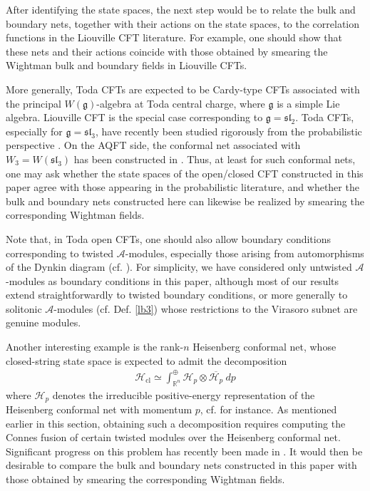 \documentclass[11pt,b5paper,notitlepage]{article}
\theoremstyle{definition}
\theoremstyle{plain}
\newcommand{\fk}{\mathfrak}
\newcommand{\ovl}{\overline}
\newcommand{\gk}{\mathfrak g}
\newcommand{\Rbb}{\mathbb R}
\newcommand{\MA}{\mathcal A}
\newcommand{\MH}{\mathcal H}
\newcommand{\Hcl}{\mathcal H_{\mathrm{cl}}}
\numberwithin{equation}{section}
\begin{document}
After identifying the state spaces, the next step would be to relate the bulk and boundary nets, together with their actions on the state spaces, to the correlation functions in the Liouville CFT literature. For example, one should show that these nets and their actions coincide with those obtained by smearing the Wightman bulk and boundary fields in Liouville CFTs.


More generally, Toda CFTs are expected to be Cardy-type CFTs associated with the principal $W(\gk)$-algebra at Toda central charge, where $\gk$ is a simple Lie algebra. Liouville CFT is the special case corresponding to $\gk=\fk{sl}_2$. Toda CFTs, especially for $\gk=\fk{sl}_3$, have recently been studied rigorously from the probabilistic perspective \cite{CRV23,CH22,Cer24,Cer25,CH24a,CH24b,CH25}. On the AQFT side, the conformal net associated with $W_3=W(\fk{sl}_3)$ has been constructed in \cite{CTW23,CTW22}. Thus, at least for such conformal nets, one may ask whether the state spaces of the open/closed CFT constructed in this paper agree with those appearing in the probabilistic literature, and whether the bulk and boundary nets constructed here can likewise be realized by smearing the corresponding Wightman fields.

Note that, in Toda open CFTs, one should also allow boundary conditions corresponding to twisted $\MA$-modules, especially those arising from automorphisms of the Dynkin diagram (cf. \cite{CH24a,CH24b,CH25}). For simplicity, we have considered only untwisted $\MA$-modules as boundary conditions in this paper, although most of our results extend straightforwardly to twisted boundary conditions, or more generally to solitonic $\MA$-modules (cf. Def. \ref{lb3}) whose restrictions to the Virasoro subnet are genuine modules.


Another interesting example is the rank-$n$ Heisenberg conformal net, whose closed-string state space is expected to admit the decomposition
\begin{align*}
\Hcl\simeq\int_{\Rbb^n}^\oplus\MH_p\otimes\ovl{\MH_p}~dp
\end{align*}
where $\MH_p$ denotes the irreducible positive-energy representation of the Heisenberg conformal net with momentum $p$, cf. \cite[Sec. B.1]{Luk07} for instance. As mentioned earlier in this section, obtaining such a decomposition requires computing the Connes fusion of certain twisted modules over the Heisenberg conformal net. Significant progress on this problem has recently been made in \cite{MS25,MS26c}. It would then be desirable to compare the bulk and boundary nets constructed in this paper with those obtained by smearing the corresponding Wightman fields.
\end{document}

